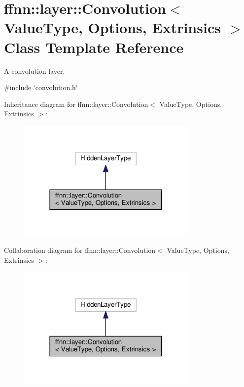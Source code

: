\hypertarget{classffnn_1_1layer_1_1_convolution}{\section{ffnn\-:\-:layer\-:\-:Convolution$<$ Value\-Type, Options, Extrinsics $>$ Class Template Reference}
\label{classffnn_1_1layer_1_1_convolution}
}


A convolution layer.  




{\ttfamily \#include \char`\"{}convolution.\-h\char`\"{}}



Inheritance diagram for ffnn\-:\-:layer\-:\-:Convolution$<$ Value\-Type, Options, Extrinsics $>$\-:\nopagebreak
\begin{figure}[H]
\begin{center}
\leavevmode
\includegraphics[width=250pt]{classffnn_1_1layer_1_1_convolution__inherit__graph}
\end{center}
\end{figure}


Collaboration diagram for ffnn\-:\-:layer\-:\-:Convolution$<$ Value\-Type, Options, Extrinsics $>$\-:\nopagebreak
\begin{figure}[H]
\begin{center}
\leavevmode
\includegraphics[width=250pt]{classffnn_1_1layer_1_1_convolution__coll__graph}
\end{center}
\end{figure}
